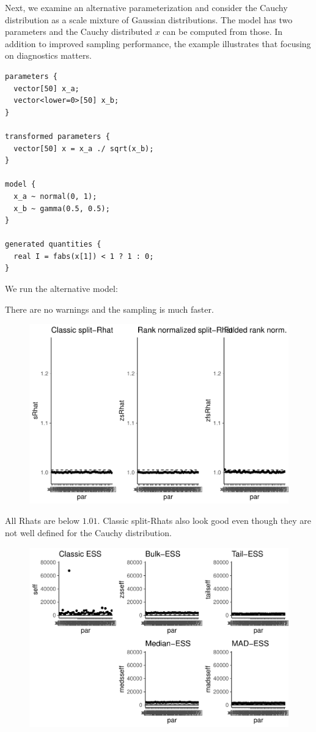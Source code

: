 \documentclass[american,]{article}
\begin{document}
Next, we examine an alternative parameterization and consider the Cauchy
distribution as a scale mixture of Gaussian distributions. The model has
two parameters and the Cauchy distributed \(x\) can be computed from
those. In addition to improved sampling performance, the example
illustrates that focusing on diagnostics matters.

\begin{verbatim}
parameters {
  vector[50] x_a;
  vector<lower=0>[50] x_b;
}

transformed parameters {
  vector[50] x = x_a ./ sqrt(x_b);
}

model {
  x_a ~ normal(0, 1);
  x_b ~ gamma(0.5, 0.5);
}

generated quantities {
  real I = fabs(x[1]) < 1 ? 1 : 0;
}
\end{verbatim}

We run the alternative model:

There are no warnings and the sampling is much faster.

\begin{figure}[tp]
  \centering
  \includegraphics[width=0.6\linewidth]{graphics/rhat-fit-alt1-1.pdf}
\end{figure}

All Rhats are below \(1.01\). Classic split-Rhats also look good even
though they are not well defined for the Cauchy distribution.

\begin{figure}[tp]
  \centering
  \includegraphics[width=0.6\linewidth]{graphics/ess-fit-alt1-1.pdf}
\end{figure}
\end{document}
